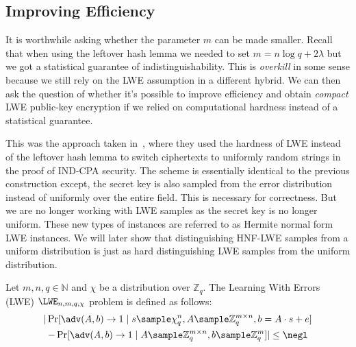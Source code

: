 \subsection{Improving Efficiency}
It is worthwhile asking whether the parameter $m$ can be made smaller. Recall that when using the leftover hash lemma we needed to set $m = n\log{q} + 2\lambda$ but we got a statistical guarantee of indistinguishability. This is \emph{overkill} in some sense because we still rely on the LWE assumption in a different hybrid. We can then ask the question of whether it's possible to improve efficiency and obtain \emph{compact} LWE public-key encryption if we relied on computational hardness instead of a statistical guarantee.

This was the approach taken in~\cite{RSA:LinPei11}, where they used the hardness of LWE instead of the leftover hash lemma to switch ciphertexts to uniformly random strings in the proof of IND-CPA security. The scheme is essentially identical to the previous construction except, the secret key is also sampled from the error distribution instead of uniformly over the entire field. This is necessary for correctness. But we are no longer working with LWE samples as the secret key is no longer uniform. These new types of instances are referred to as Hermite normal form LWE instances. We will later show that distinguishing HNF-LWE samples from a uniform distribution is just as hard distinguishing LWE samples from the uniform distribution.

\begin{definition}
    Let $m,n,q \in \mathbb{N}$ and $\chi$ be a distribution over $\mathbb{Z}_q$. The Learning With Errors (LWE) $\LWE_{n,m,q,\chi}$ problem is defined as follows:
    \begin{multline*}
        |\Pr[\adv(A,b) \to 1 \mid s \sample \chi_q^n, A \sample \mathbb{Z}_q^{m \times n}, b = A \cdot s + e ] \\
        - \Pr[\adv(A,b) \to 1 \mid A \sample \mathbb{Z}_q^{m \times n}, b \sample \mathbb{Z}_q^m ]|\leq \negl
    \end{multline*}
\end{definition}

